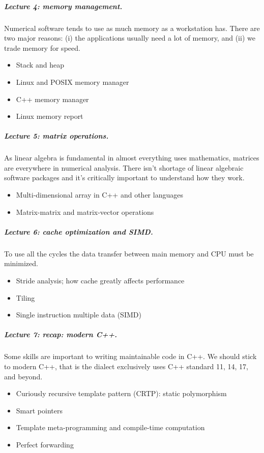 \documentclass[11pt,a4paper]{article}
\begin{document}
\subparagraph{Lecture 4: memory management.}  Numerical software tends to use
as much memory as a workstation has.  There are two major reasons: (i) the
applications usually need a lot of memory, and (ii) we trade memory for speed.

\begin{itemize}
\item Stack and heap
\item Linux and POSIX memory manager
\item C++ memory manager
\item Linux memory report
\end{itemize}

\subparagraph{Lecture 5: matrix operations.}  As linear algebra is fundamental
in almost everything uses mathematics, matrices are everywhere in numerical
analysis.  There isn't shortage of linear algebraic software packages and it's
critically important to understand how they work.

\begin{itemize}
\item Multi-dimensional array in C++ and other languages
\item Matrix-matrix and matrix-vector operations
\end{itemize}

\subparagraph{Lecture 6: cache optimization and SIMD.}  To use all the cycles
the data transfer between main memory and CPU must be minimized.

\begin{itemize}
\item Stride analysis; how cache greatly affects performance
\item Tiling
\item Single instruction multiple data (SIMD)
\end{itemize}

\subparagraph{Lecture 7: recap: modern C++.}  Some skills are important to
writing maintainable code in C++.  We should stick to modern C++, that is the
dialect exclusively uses C++ standard 11, 14, 17, and beyond.

\begin{itemize}
\item Curiously recursive template pattern (CRTP): static polymorphism
\item Smart pointers
\item Template meta-programming and compile-time computation
\item Perfect forwarding
\end{itemize}
\end{document}

